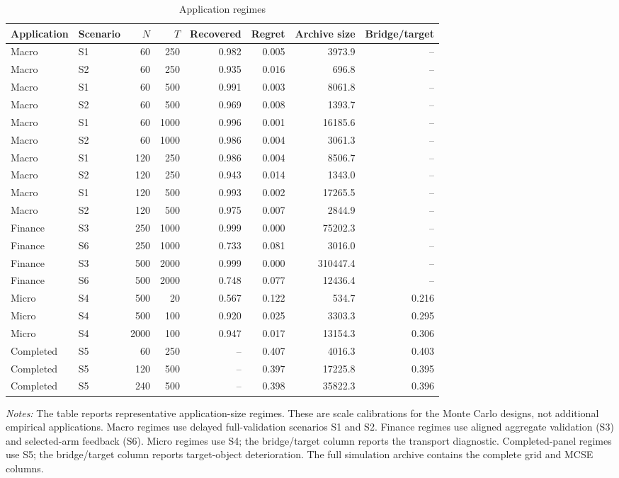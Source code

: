 \documentclass[a4paper,12pt]{article}
\newcommand{\1}{\mathbf{1}}
\newcommand{\ExhibitNote}[1]{\begin{minipage}{0.94\textwidth}\footnotesize\emph{Notes:} #1\end{minipage}}
\begin{document}
\begin{landscape}
\begin{table}[p]
\centering
\caption{Application regimes}
\label{tab:ia_mc_application_regimes}
\scriptsize
\begin{adjustbox}{max width=\linewidth}
\begin{tabular}{@{}llrrrrrr@{}}
\toprule
Application & Scenario & $N$ & $T$ & Recovered & Regret & Archive size & Bridge/target \\
\midrule
Macro & S1 & 60 & 250 & 0.982 & 0.005 & 3973.9 & -- \\
Macro & S2 & 60 & 250 & 0.935 & 0.016 & 696.8 & -- \\
Macro & S1 & 60 & 500 & 0.991 & 0.003 & 8061.8 & -- \\
Macro & S2 & 60 & 500 & 0.969 & 0.008 & 1393.7 & -- \\
Macro & S1 & 60 & 1000 & 0.996 & 0.001 & 16185.6 & -- \\
Macro & S2 & 60 & 1000 & 0.986 & 0.004 & 3061.3 & -- \\
Macro & S1 & 120 & 250 & 0.986 & 0.004 & 8506.7 & -- \\
Macro & S2 & 120 & 250 & 0.943 & 0.014 & 1343.0 & -- \\
Macro & S1 & 120 & 500 & 0.993 & 0.002 & 17265.5 & -- \\
Macro & S2 & 120 & 500 & 0.975 & 0.007 & 2844.9 & -- \\
Finance & S3 & 250 & 1000 & 0.999 & 0.000 & 75202.3 & -- \\
Finance & S6 & 250 & 1000 & 0.733 & 0.081 & 3016.0 & -- \\
Finance & S3 & 500 & 2000 & 0.999 & 0.000 & 310447.4 & -- \\
Finance & S6 & 500 & 2000 & 0.748 & 0.077 & 12436.4 & -- \\
Micro & S4 & 500 & 20 & 0.567 & 0.122 & 534.7 & 0.216 \\
Micro & S4 & 500 & 100 & 0.920 & 0.025 & 3303.3 & 0.295 \\
Micro & S4 & 2000 & 100 & 0.947 & 0.017 & 13154.3 & 0.306 \\
Completed & S5 & 60 & 250 & -- & 0.407 & 4016.3 & 0.403 \\
Completed & S5 & 120 & 500 & -- & 0.397 & 17225.8 & 0.395 \\
Completed & S5 & 240 & 500 & -- & 0.398 & 35822.3 & 0.396 \\
\bottomrule
\end{tabular}
\end{adjustbox}
\par\medskip
\ExhibitNote{The table reports representative application-size regimes. These are scale calibrations for the Monte Carlo designs, not additional empirical applications. Macro regimes use delayed full-validation scenarios S1 and S2. Finance regimes use aligned aggregate validation (S3) and selected-arm feedback (S6). Micro regimes use S4; the bridge/target column reports the transport diagnostic. Completed-panel regimes use S5; the bridge/target column reports target-object deterioration. The full simulation archive contains the complete grid and MCSE columns.}
\end{table}
\end{landscape}
\end{document}

